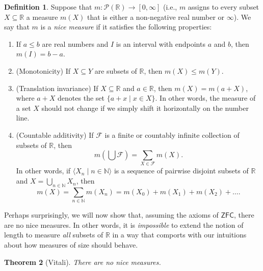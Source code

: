 \documentclass[a4paper]{memoir}
\newtheorem{theorem}{Theorem}[section]
\theoremstyle{definition}
\newtheorem{definition}[theorem]{Definition}
\newcommand{\bb}{\mathbb}
\newcommand{\power}{\ensuremath{\mathscr{P}}}
\begin{document}
\begin{definition} \label{def: nice measure}
  Suppose that $m : \power(\mathbb{R}) \rightarrow [0,\infty]$ (i.e., $m$ assigns to every subset 
  $X \subseteq \mathbb{R}$ a measure $m(X)$ that is either a non-negative real number or $\infty$). 
  We say that $m$ is a \emph{nice measure} if it satisfies the following properties:
  \begin{enumerate}
    \item If $a \leq b$ are real numbers and $I$ is an interval with endpoints $a$ and $b$, then 
    $m(I) = b-a$.
    \item (Monotonicity) If $X \subseteq Y$ are subsets of $\bb{R}$, then $m(X) \leq m(Y)$.
    \item (Translation invariance) If $X \subseteq \bb{R}$ and $a \in \bb{R}$, then 
    $m(X) = m(a + X)$, where $a + X$ denotes the set $\{a + x \mid x \in X\}$. In other words, 
    the measure of a set $X$ should not change if we simply shift it horizontally on the number line.
    \item (Countable additivity) If $\mathcal{F}$ is a finite or countably infinite collection of 
    subsets of $\bb{R}$, then
    \[
      m\left(\bigcup \mathcal{F}\right) = \sum_{X \in \mathcal{F}} m(X).
    \]
    In other words, if $\langle X_n \mid n \in \mathbb{N} \rangle$ is a sequence of pairwise 
    disjoint subsets of $\bb{R}$ and $X  = \bigcup_{n \in \mathbb{N}} X_n$, then 
    \[
      m(X) = \sum_{n \in \bb{N}} m(X_n) = m(X_0) + m(X_1) + m(X_2) + \ldots.
    \]
  \end{enumerate}
\end{definition}

Perhaps surprisingly, we will now show that, assuming the axioms of $\mathsf{ZFC}$, there 
are no nice measures. In other words, it is \emph{impossible} to extend the notion of length to 
measure \emph{all} subsets of $\mathbb{R}$ in a way that comports with our intuitions about 
how measures of size should behave.

\begin{theorem}[Vitali] \label{thm: vitali}
  There are no nice measures.
\end{theorem}
\end{document}
